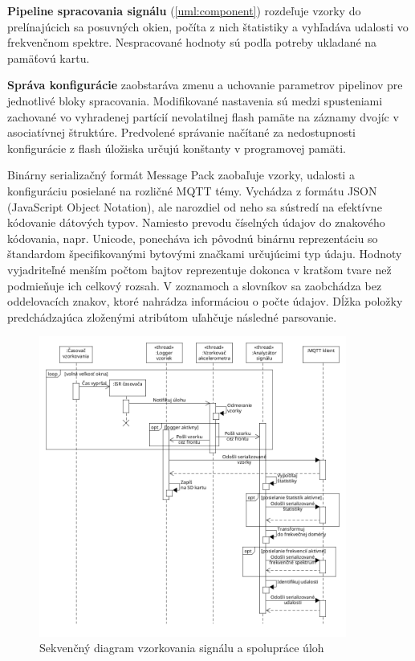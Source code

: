 \textbf{Pipeline spracovania signálu} (\ref{uml:component}) rozdeľuje vzorky do prelínajúcich sa posuvných okien, počíta z nich štatistiky
a vyhľadáva udalosti vo frekvenčnom spektre. Nespracované hodnoty sú podľa potreby ukladané na pamäťovú kartu.

\textbf{Správa konfigurácie} zaobstaráva zmenu a uchovanie parametrov pipelinov pre jednotlivé bloky spracovania.
Modifikované nastavenia sú
medzi spusteniami zachované vo vyhradenej partícií nevolatilnej flash pamäte na záznamy dvojíc v asociatívnej štruktúre. Predvolené
správanie načítané za nedostupnosti konfigurácie z flash úložiska určujú konštanty v programovej pamäti.

Binárny serializačný formát Message Pack zaobaľuje vzorky, udalosti a konfiguráciu posielané na rozličné MQTT témy. Vychádza z
formátu JSON (JavaScript Object Notation), ale narozdiel od neho sa sústredí na efektívne kódovanie dátových typov. Namiesto prevodu
číselných údajov do znakového kódovania, napr. Unicode, ponecháva ich pôvodnú binárnu reprezentáciu so štandardom špecifikovanými bytovými
značkami určujúcimi typ údaju. Hodnoty vyjadriteľné menším počtom bajtov reprezentuje dokonca v kratšom tvare než
podmieňuje ich celkový rozsah. V zoznamoch a slovníkov sa zaobchádza bez oddelovacích znakov, ktoré nahrádza
informáciou o počte údajov. Dĺžka položky predchádzajúca zloženými atribútom uľahčuje následné parsovanie.

\begin{figure}[h]
	\centering
	\includegraphics[width=0.9\textwidth]{figures/design/tasks.png}
	\caption{Sekvenčný diagram vzorkovania signálu a spolupráce úloh}
	\label{uml:sequence}
\end{figure}

